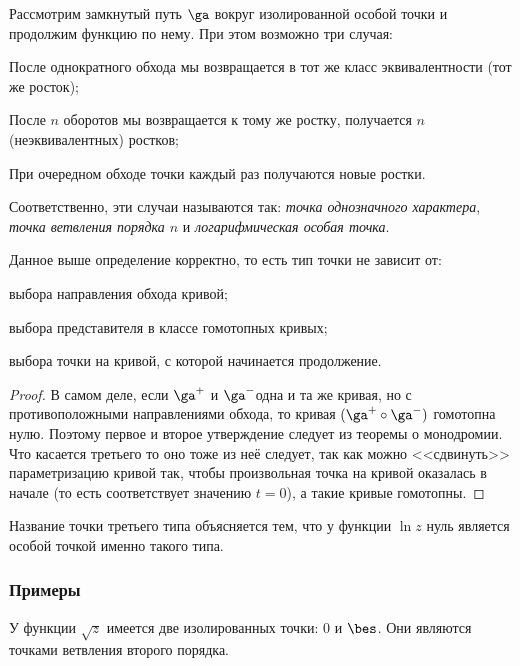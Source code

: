 \documentclass[a4paper]{article}
\begin{document}
\begin{df}
Рассмотрим замкнутый путь $\ga$ вокруг изолированной особой точки и продолжим функцию по нему. При этом возможно
три случая:

\begin{nums}{-2}
\item После однократного обхода мы возвращается в тот же класс эквивалентности (тот же росток);
\item После $n$ оборотов мы возвращается к тому же ростку,  получается $n$ (неэквивалентных) ростков;
\item При очередном обходе точки каждый раз получаются новые ростки.
\end{nums}

Соответственно, эти случаи называются так: \emph{точка однозначного характера}, \emph{точка ветвления порядка $n$} и
\emph{логарифмическая особая точка}.
\end{df}

\begin{stm}
Данное выше определение корректно, то есть тип точки не зависит от:
\begin{items}{-2}
\item выбора направления обхода кривой;
\item выбора представителя в классе гомотопных кривых;
\item выбора точки на кривой, с которой начинается продолжение.
\end{items}
\end{stm}
\begin{proof}
В самом деле, если $\ga^+$ и $\ga^-$\т одна и та же кривая, но с противоположными направлениями обхода, то
кривая $(\ga^+ \circ \ga^-)$ гомотопна нулю. Поэтому первое и второе утверждение следует из теоремы о монодромии.
Что касается третьего то оно тоже из неё следует, так как можно <<сдвинуть>> параметризацию кривой так, чтобы
произвольная точка на кривой оказалась в начале (то есть соответствует значению $t=0$), а такие кривые гомотопны.
\end{proof}

Название точки третьего типа объясняется тем, что у функции $\ln z$ нуль является особой точкой именно такого типа.

\subsubsection{Примеры}

\begin{ex}
У функции $\sqrt{z}$ имеется две изолированных точки: $0$ и $\bes$. Они являются точками ветвления второго порядка.
\end{ex}
\end{document}
